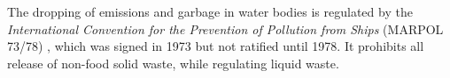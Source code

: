 The dropping of emissions and garbage in water bodies is regulated by the \textit{International Convention for the Prevention of Pollution from Ships} (MARPOL 73/78) \cite[-3em]{canyon1978international}, which was signed in 1973 but not ratified until 1978. It prohibits all release of non-food solid waste, while regulating liquid waste.

\begin{figure}[tb]
    \centering
\end{figure}

